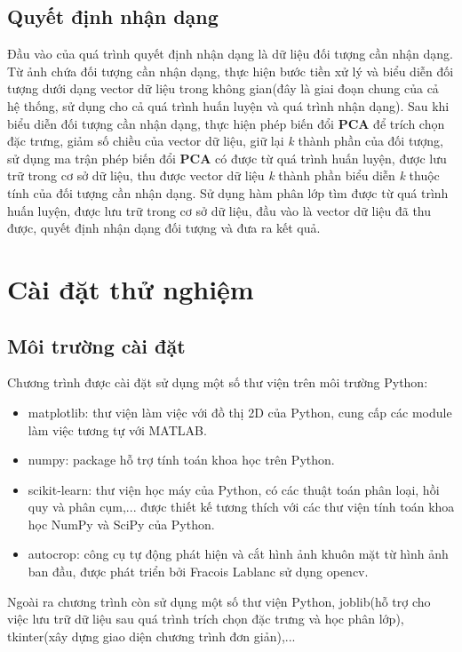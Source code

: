 \documentclass[12pt,a4paper]{article}
\begin{document}
\subsection{Quyết định nhận dạng} 
Đầu vào của quá trình quyết định nhận dạng là dữ liệu đối tượng cần nhận dạng. Từ ảnh chứa đối tượng cần nhận dạng, thực hiện bước tiền xử lý và biểu diễn đối tượng dưới dạng vector dữ liệu trong không gian(đây là giai đoạn chung của cả hệ thống, sử dụng cho cả quá trình huấn luyện và quá trình nhận dạng). Sau khi biểu diễn đối tượng cần nhận dạng, thực hiện phép biến đổi \textbf{PCA} để trích chọn đặc trưng, giảm số chiều của vector dữ liệu, giữ lại \textit{k} thành phần của đối tượng, sử dụng ma trận phép biến đổi \textbf{PCA} có được từ quá trình huấn luyện, được lưu trữ trong cơ sở dữ liệu, thu được vector dữ liệu \textit{k} thành phần biểu diễn \textit{k} thuộc tính của đối tượng cần nhận dạng.
Sử dụng hàm phân lớp tìm được từ quá trình huấn luyện, được lưu trữ trong cơ sở dữ liệu, đầu vào là vector dữ liệu đã thu được, quyết định nhận dạng đối tượng và đưa ra kết quả. 

\section{Cài đặt thử nghiệm}
\subsection{Môi trường cài đặt}
Chương trình được cài đặt sử dụng một số thư viện trên môi trường \textsf{Python}: \par 
\begin{itemize}
\item \textsf{matplotlib}: thư viện làm việc với đồ thị 2D của \textsf{Python}, cung cấp các module làm việc tương tự với MATLAB.
\item \textsf{numpy}: package hỗ trợ tính toán khoa học trên \textsf{Python}.
\item \textsf{scikit-learn}: thư viện học máy của \textsf{Python}, có các thuật toán phân loại, hồi quy và phân cụm,... được thiết kế tương thích với các thư viện tính toán khoa học \textsf{NumPy} và \textsf{SciPy} của \textsf{Python}.
\item \textsf{autocrop}: công cụ tự động phát hiện và cắt hình ảnh khuôn mặt từ hình ảnh ban đầu, được phát triển bởi Fracois Lablanc sử dụng \textsf{opencv}.
\end{itemize}  
\par 
Ngoài ra chương trình còn sử dụng một số thư viện \textsf{Python}, \textsf{joblib}(hỗ trợ cho việc lưu trữ dữ liệu sau quá trình trích chọn đặc trưng và học phân lớp), \textsf{tkinter}(xây dựng giao diện chương trình đơn giản),...
\end{document}
